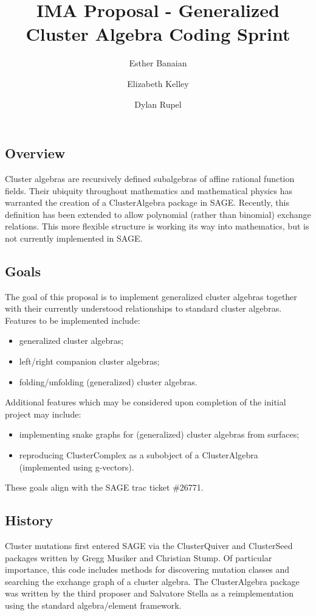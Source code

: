 \documentclass{amsart}
\title{IMA Proposal - Generalized Cluster Algebra Coding Sprint}
\author{Esther Banaian}
\author{Elizabeth Kelley}
\author{Dylan Rupel}
\begin{document}
  \maketitle

  \subsection*{Overview}
  Cluster algebras are recursively defined subalgebras of affine rational function fields.
  Their ubiquity throughout mathematics and mathematical physics has warranted the creation of a ClusterAlgebra package in SAGE.
  Recently, this definition has been extended to allow polynomial (rather than binomial) exchange relations.
  This more flexible structure is working its way into mathematics, but is not currently implemented in SAGE.

  \subsection*{Goals}
  The goal of this proposal is to implement generalized cluster algebras together with their currently understood relationships to standard cluster algebras.
  Features to be implemented include:
  \begin{itemize}
    \item generalized cluster algebras;
    \item left/right companion cluster algebras;
    \item folding/unfolding (generalized) cluster algebras.
  \end{itemize}
  Additional features which may be considered upon completion of the initial project may include:
  \begin{itemize}
    \item implementing snake graphs for (generalized) cluster algebras from surfaces;
    \item reproducing ClusterComplex as a subobject of a ClusterAlgebra (implemented using g-vectors).
  \end{itemize}
  These goals align with the SAGE trac ticket \#26771.

  \subsection*{History}
  Cluster mutations first entered SAGE via the ClusterQuiver and ClusterSeed packages written by Gregg Musiker and Christian Stump.  
  Of particular importance, this code includes methods for discovering mutation classes and searching the exchange graph of a cluster algebra.
  The ClusterAlgebra package was written by the third proposer and Salvatore Stella as a reimplementation using the standard algebra/element framework.
\end{document}
